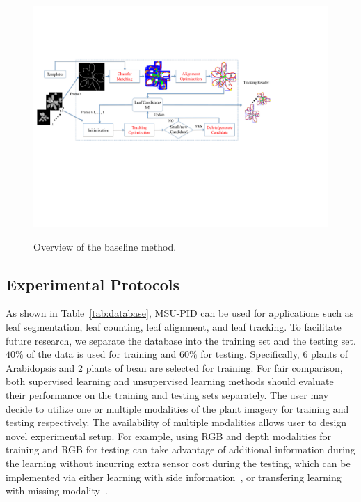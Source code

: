 \begin{figure}[t!]
\centering
\includegraphics[width=.98\textwidth]{Figures/overview}\\
\caption{Overview of the baseline method.}
\label{fig:methodOverview}
\end{figure}

\subsection{Experimental Protocols}
\label{sec:protocol}
As shown in Table~\ref{tab:database}, MSU-PID can be used for applications such as leaf segmentation, leaf counting, leaf alignment, and leaf tracking.
To facilitate future research, we separate the database into the training set and the testing set.
$40\%$ of the data is used for training and $60\%$ for testing.
Specifically, $6$ plants of Arabidopsis and $2$ plants of bean are selected for training.
For fair comparison, both supervised learning and unsupervised learning methods should evaluate their performance on the training and testing sets separately.
The user may decide to utilize one or multiple modalities of the plant imagery for training and testing respectively.
The availability of multiple modalities allows user to design novel experimental setup.
For example, using RGB and depth modalities for training and RGB for testing can take advantage of additional information during the learning without incurring extra sensor cost during the testing, which can be implemented via either learning with side information~\cite{chen2013boosting}, or transfering learning with missing modality~\cite{ding2014latent}.


